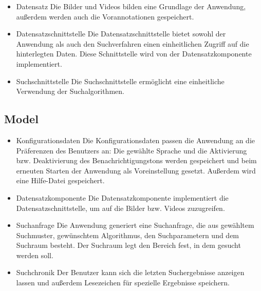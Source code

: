 \begin{itemize}
\item Datensatz\newline
Die Bilder und Videos bilden eine Grundlage der Anwendung, außerdem werden auch die Vorannotationen gespeichert.
\item Datensatzschnittstelle\newline
Die Datensatzschnittstelle bietet sowohl der Anwendung als auch den Suchverfahren einen einheitlichen Zugriff auf die hinterlegten Daten. Diese Schnittstelle wird von der Datensatzkomponente implementiert.
\item Suchschnittstelle\newline
Die Suchschnittstelle ermöglicht eine einheitliche Verwendung der Suchalgorithmen.
\end{itemize}

\subsection{Model}
\begin{itemize}
\item Konfigurationsdaten\newline
Die Konfigurationsdaten passen die Anwendung an die Präferenzen des Benutzers an: Die gewählte Sprache und die Aktivierung bzw. Deaktivierung des Benachrichtigungstons werden gespeichert und beim erneuten Starten der Anwendung als Voreinstellung gesetzt. Außerdem wird eine Hilfe-Datei gespeichert.
\item Datensatzkomponente\newline
Die Datensatzkomponente implementiert die Datensatzschnittstelle, um auf die Bilder bzw. Videos zuzugreifen.
\item Suchanfrage\newline
Die Anwendung generiert eine Suchanfrage, die aus gewähltem Suchmuster, gewünschtem Algorithmus, den Suchparametern und dem Suchraum besteht. Der Suchraum legt den Bereich fest, in dem gesucht werden soll.
\item Suchchronik\newline
Der Benutzer kann sich die letzten Suchergebnisse anzeigen lassen und außerdem Lesezeichen für spezielle Ergebnisse speichern.
\end{itemize}

